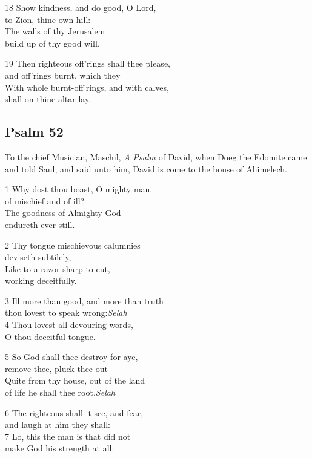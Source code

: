 \begin{multicols}{3}
18 Show kindness, and do good, O Lord,\\
to Zion, thine own hill:\\
The walls of thy Jerusalem\\
build up of thy good will.

19 Then righteous off’rings shall thee please,\\
and off’rings burnt, which they\\
With whole burnt-off’rings, and with calves,\\
shall on thine altar lay.

\begin{center}
\quad{}\quad{}
\end{center}

\subsection*{Psalm 52}

To the chief Musician, Maschil, \emph{A Psalm} of David,
when Doeg the Edomite came and told Saul, and said unto him, David is come to the house of Ahimelech.

1 Why dost thou boast, O mighty man,\\
of mischief and of ill?\\
The goodness of Almighty God\\
endureth ever still.

2 Thy tongue mischievous calumnies\\
deviseth subtilely,\\
Like to a razor sharp to cut,\\
working deceitfully.

3 Ill more than good, and more than truth\\
thou lovest to speak wrong:\hfill \emph{Selah}\\
4 Thou lovest all-devouring words,\\
O thou deceitful tongue.

5 So God shall thee destroy for aye,\\
remove thee, pluck thee out\\
Quite from thy house, out of the land\\
of life he shall thee root.\hfill\emph{Selah}

6 The righteous shall it see, and fear,\\
and laugh at him they shall:\\
7 Lo, this the man is that did not\\
make God his strength at all:


\end{multicols}
